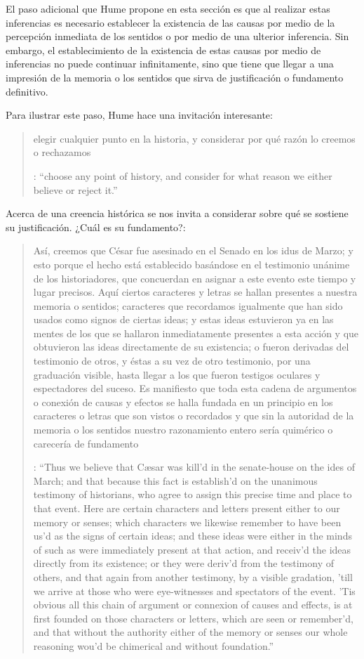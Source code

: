 El paso adicional que Hume propone en esta sección es que al realizar estas inferencias es necesario establecer la existencia de las causas por medio de la percepción inmediata de los sentidos o por medio de una ulterior inferencia. Sin embargo, el establecimiento de la existencia de estas causas por medio de inferencias no puede continuar infinitamente, sino que tiene que llegar a una impresión de la memoria o los sentidos que sirva de justificación o fundamento definitivo.

Para ilustrar este paso, Hume hace una invitación interesante: \blockquote[{\cite[58]{hume1740treatise}}: \enquote{choose any point of history, and consider for what reason we either believe or reject it.}]{elegir cualquier punto en la historia, y considerar por qué razón lo creemos o rechazamos}. Acerca de una creencia histórica se nos invita a considerar sobre qué se sostiene su justificación. ¿Cuál es su fundamento?: \blockquote[{\cite[58-59]{hume1740treatise}}: \enquote{Thus we believe that Cæsar was kill’d in the senate-house on the ides of March; and that because this fact is establish’d on the unanimous testimony of historians, who agree to assign this precise time and place to that event. Here are certain characters and letters present either to our memory or senses; which characters we likewise remember to have been us’d as the signs of certain ideas; and these ideas were either in the minds of such as were immediately present at that action, and receiv’d the ideas directly from its existence; or they were deriv’d from the testimony of others, and that again from another testimony, by a visible gradation, ’till we arrive at those who were eye-witnesses and spectators of the event. ’Tis obvious all this chain of argument or connexion of causes and effects, is at first founded on those characters or letters, which are seen or remember’d, and that without the authority either of the memory or senses our whole reasoning wou’d be chimerical and without foundation.}]{Así, creemos que César fue asesinado en el Senado en los idus de Marzo; y esto porque el hecho está establecido basándose en el testimonio unánime de los historiadores, que concuerdan en asignar a este evento este tiempo y lugar precisos. Aquí ciertos caracteres y letras se hallan presentes a nuestra memoria o sentidos; caracteres que recordamos igualmente que han sido usados como signos de ciertas ideas; y estas ideas estuvieron ya en las mentes de los que se hallaron inmediatamente presentes a esta acción y que obtuvieron las ideas directamente de su existencia; o fueron derivadas del testimonio de otros, y éstas a su vez de otro testimonio, por una graduación visible, hasta llegar a los que fueron testigos oculares y espectadores del suceso. Es manifiesto que toda esta cadena de argumentos o conexión de causas y efectos se halla fundada en un principio en los caracteres o letras que son vistos o recordados y que sin la autoridad de la memoria o los sentidos nuestro razonamiento entero sería quimérico o carecería de fundamento}.

